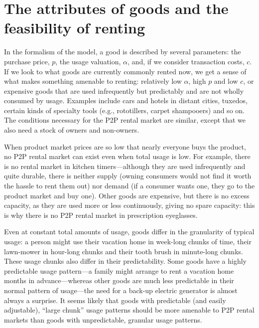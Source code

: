\documentclass[11pt]{article}
\begin{document}




\section{The attributes of goods and the feasibility of renting} 
In the formalism of the model, a good is described by several parameters: the purchase price, $p$, the usage valuation, $\alpha$, and, if we consider transaction costs, $c$.  
If we look to what goods are currently commonly rented now, we get a sense of what makes something amenable to renting: 
relatively low $\alpha$, high $p$ and low $c$, or expensive goods that are used infrequently but predictably and are not wholly consumed by usage. 
Examples include cars and hotels in distant cities, tuxedos, certain kinds of specialty tools (e.g., rototillers, carpet shampooers) and so on. 
The conditions necessary for the P2P rental market are similar, except that we also need a stock of owners and non-owners. 

When product market prices are so low that nearly everyone buys the product, no P2P rental market can exist even when total usage is low.  
For example, there is no rental market in kitchen timers---although they are used infrequently and quite durable, there is neither supply (owning consumers would not find it worth the hassle to rent them out) nor demand (if a consumer wants one, they go to the product market and buy one). 
Other goods are expensive, but there is no excess capacity, as they are used more or less continuously, giving no spare capacity: this is why there is no P2P rental market in prescription eyeglasses. 

Even at constant total amounts of usage, goods differ in the granularity of typical usage: 
a person might use their vacation home in week-long chunks of time, their lawn-mower in hour-long chunks and their tooth brush in minute-long chunks. 
These usage chunks also differ in their predictability. 
Some goods have a highly predictable usage pattern---a family might arrange to rent a vacation home months in advance---whereas other goods are much less predictable in their normal pattern of usage---the need for a back-up electric generator is almost always a surprise.  
It seems likely that goods with predictable (and easily adjustable), ``large chunk'' usage patterns should be more amenable to P2P rental markets than goods with unpredictable, granular usage patterns. 
\end{document}
